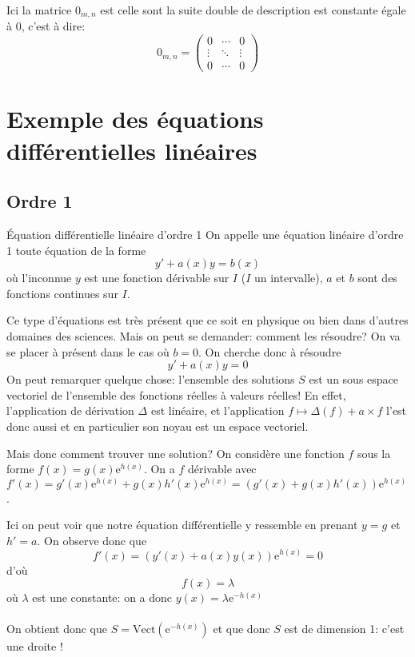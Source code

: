 \documentclass{classe}
\begin{document}
Ici la matrice $0_{m, n}$ est celle sont la suite double de description est constante égale à $0$, c'est à dire:
\begin{equation*}
	0_{m, n} = \begin{pmatrix}
		0 & \cdots & 0\\
		\vdots & \ddots & \vdots\\
		0 & \cdots & 0
	\end{pmatrix}
\end{equation*}

\section{Exemple des équations différentielles linéaires}
\subsection{Ordre 1}

\begin{définition}{Équation différentielle linéaire d'ordre 1}{}
On appelle une équation linéaire d'ordre 1 toute équation de la forme
$$y' + a(x)y = b(x)$$
où l'inconnue $y$ est une fonction dérivable sur $I$ ($I$ un intervalle), $a$ et $b$ sont des fonctions continues sur $I$.
\end{définition}

Ce type d'équations est très présent que ce soit en physique ou bien dans d'autres domaines des sciences.
Mais on peut se demander: comment les résoudre?
On va se placer à présent dans le cas où $b=0$.
On cherche donc à résoudre
\begin{equation*}
y' + a(x)y = 0
\end{equation*}
On peut remarquer quelque chose: l'ensemble des solutions $S$ est un sous espace vectoriel de l'ensemble des fonctions réelles à valeurs réelles!
En effet, l'application de dérivation $\Delta$ est linéaire, et l'application $f \mapsto \Delta\left( f \right) + a \times f$ l'est donc aussi et en particulier son noyau est un espace vectoriel.

Mais donc comment trouver une solution?
On considère une fonction $f$ sous la forme $f(x) = g(x)\mathrm{e}^{h(x)}$. On a $f$ dérivable avec $f'(x) = g'(x)\mathrm{e}^{h(x)} + g(x)h'(x)\mathrm{e}^{h(x)} = (g'(x) + g(x)h'(x))\mathrm{e}^{h(x)}$.

Ici on peut voir que notre équation différentielle y ressemble en prenant $y = g$ et $h' = a$. On observe donc que
$$f'(x) = (y'(x) + a(x)y(x))\mathrm{e}^{h(x)} = 0$$
d'où
$$f(x) = \lambda$$
où $\lambda$ est une constante: on a donc $y(x) = \lambda\mathrm{e}^{-h(x)}$
\\\\
On obtient donc que $S = \mathrm{Vect}(\mathrm{e}^{-h(x)})$ et que donc $S$ est de dimension 1: c'est une droite !
\end{document}
